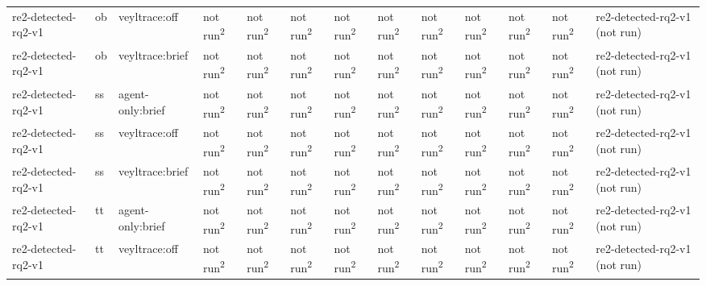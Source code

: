 \begin{table}[t]
\begin{tabular}{lllllllllllll}
re2-detected-rq2-v1 & ob & veyltrace:off & not run\textsuperscript{2} & not run\textsuperscript{2} & not run\textsuperscript{2} & not run\textsuperscript{2} & not run\textsuperscript{2} & not run\textsuperscript{2} & not run\textsuperscript{2} & not run\textsuperscript{2} & not run\textsuperscript{2} & re2-detected-rq2-v1 (not run) \\
re2-detected-rq2-v1 & ob & veyltrace:brief & not run\textsuperscript{2} & not run\textsuperscript{2} & not run\textsuperscript{2} & not run\textsuperscript{2} & not run\textsuperscript{2} & not run\textsuperscript{2} & not run\textsuperscript{2} & not run\textsuperscript{2} & not run\textsuperscript{2} & re2-detected-rq2-v1 (not run) \\
re2-detected-rq2-v1 & ss & agent-only:brief & not run\textsuperscript{2} & not run\textsuperscript{2} & not run\textsuperscript{2} & not run\textsuperscript{2} & not run\textsuperscript{2} & not run\textsuperscript{2} & not run\textsuperscript{2} & not run\textsuperscript{2} & not run\textsuperscript{2} & re2-detected-rq2-v1 (not run) \\
re2-detected-rq2-v1 & ss & veyltrace:off & not run\textsuperscript{2} & not run\textsuperscript{2} & not run\textsuperscript{2} & not run\textsuperscript{2} & not run\textsuperscript{2} & not run\textsuperscript{2} & not run\textsuperscript{2} & not run\textsuperscript{2} & not run\textsuperscript{2} & re2-detected-rq2-v1 (not run) \\
re2-detected-rq2-v1 & ss & veyltrace:brief & not run\textsuperscript{2} & not run\textsuperscript{2} & not run\textsuperscript{2} & not run\textsuperscript{2} & not run\textsuperscript{2} & not run\textsuperscript{2} & not run\textsuperscript{2} & not run\textsuperscript{2} & not run\textsuperscript{2} & re2-detected-rq2-v1 (not run) \\
re2-detected-rq2-v1 & tt & agent-only:brief & not run\textsuperscript{2} & not run\textsuperscript{2} & not run\textsuperscript{2} & not run\textsuperscript{2} & not run\textsuperscript{2} & not run\textsuperscript{2} & not run\textsuperscript{2} & not run\textsuperscript{2} & not run\textsuperscript{2} & re2-detected-rq2-v1 (not run) \\
re2-detected-rq2-v1 & tt & veyltrace:off & not run\textsuperscript{2} & not run\textsuperscript{2} & not run\textsuperscript{2} & not run\textsuperscript{2} & not run\textsuperscript{2} & not run\textsuperscript{2} & not run\textsuperscript{2} & not run\textsuperscript{2} & not run\textsuperscript{2} & re2-detected-rq2-v1 (not run) \\

\end{tabular}
\end{table}
